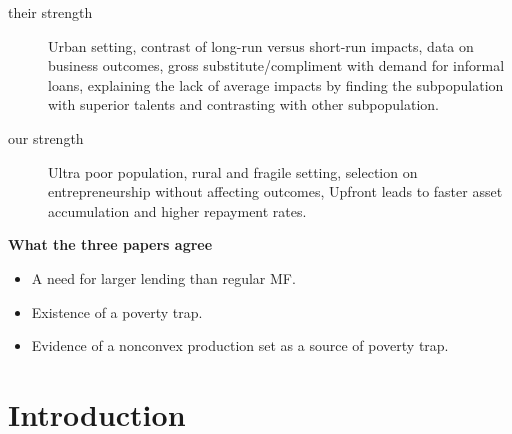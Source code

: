 \begin{description}
\vspace{1.0ex}\setlength{\itemsep}{1.0ex}\setlength{\baselineskip}{12pt}
\item[their strength]	Urban setting, contrast of long-run versus short-run impacts, data on business outcomes, gross substitute/compliment with demand for informal loans, explaining the lack of average impacts by finding the subpopulation with superior talents and contrasting with other subpopulation.
\item[our strength]	Ultra poor population, rural and fragile setting, selection on entrepreneurship without affecting outcomes, \textsf{Upfront} leads to faster asset accumulation and higher repayment rates.
\end{description}

\noindent
\textbf{What the three papers agree}

\begin{itemize}
\vspace{1.0ex}\setlength{\itemsep}{1.0ex}\setlength{\baselineskip}{12pt}
\item	A need for larger lending than regular MF.
\item	Existence of a poverty trap.
\item	Evidence of a nonconvex production set as a source of poverty trap.
\end{itemize}

\newpage
{}
\setcounter{tocdepth}{3}
\tableofcontents
\thispagestyle{empty}\setcounter{page}{0}
\newpage

\setlength{\parindent}{1em}
\vspace{2ex}




\renewcommand{\thefootnote}{*\arabic{footnote}}
\setcounter{footnote}{0}



\section{Introduction}
\label{SecIntroduction}



